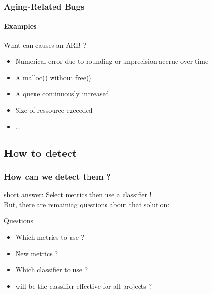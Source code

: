 \documentclass{beamer}
\begin{document}
\begin{frame}
 \frametitle{Aging-Related Bugs}
 \framesubtitle{Examples}
 \begin{exampleblock}{What can causes an ARB ?}
  \begin{itemize}
   \item Numerical error due to rounding or imprecision accrue over time
   \item A malloc() without free()
   \item A queue continuously increased
   \item Size of ressource exceeded
   \item ...
  \end{itemize}
 \end{exampleblock}
\end{frame}

\subsection{How to detect}
\begin{frame}
 \frametitle{How can we detect them ?}
 short answer: \alert{Select metrics then use a classifier !}\\
 But, there are remaining questions about that solution:\\
 \begin{block}{Questions}
  \begin{itemize}
   \item Which metrics to use ?
   \item New metrics ?
   \item Which classifier to use ?
   \item will be the classifier effective for all projects ?
  \end{itemize}
 \end{block}
\end{frame}
\end{document}
